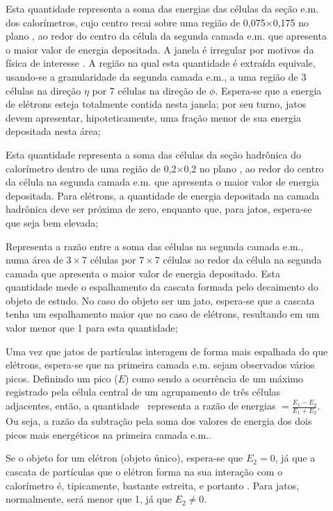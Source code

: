 \begin{description}
\item[\etem] Esta quantidade representa a soma das energias das células da
seção e.m. dos calorímetros, cujo centro recai sobre uma região de
0,075$\times$0,175 no plano \ep, ao redor do centro da célula da segunda camada
e.m. que apresenta o maior valor de energia depositada. A janela é irregular
por motivos da física de interesse \cite{hlt-tdr}. A região na qual esta
quantidade é extraída equivale, usando-se a granularidade da segunda camada
e.m., a uma região de 3 células na direção $\eta$ por 7 células na direção de
$\phi$. Espera-se que a energia de elétrons esteja totalmente contida nesta
janela; por seu turno, jatos devem apresentar, hipoteticamente, uma fração
menor de sua energia depositada nesta área;

\item[\ethad] Esta quantidade representa a soma das células da seção hadrônica
do calorímetro dentro de uma região de 0,2$\times$0,2 no plano \ep, ao redor
do centro da célula na segunda camada e.m. que apresenta o maior valor de
energia depositada. Para elétrons, a quantidade de energia depositada na
camada hadrônica deve ser próxima de zero, enquanto que, para jatos, espera-se
que seja bem elevada;

\item[\rshape] Representa a razão entre a soma das células na segunda camada
e.m., numa área de $3\times7$ células por $7\times7$ células ao redor da célula
na segunda camada que apresenta o maior valor de energia depositado. Esta
quantidade mede o espalhamento da cascata formada pelo decaimento do objeto de
estudo. No caso do objeto ser um jato, espera-se que a cascata tenha um
espalhamento maior que no caso de elétrons, resultando em um valor menor que 1
para esta quantidade;

\item[\rstrip] Uma vez que jatos de par\-tí\-culas interagem de forma mais
espalhada do que e\-lé\-trons, espera-se que na primeira camada e.m. sejam
observados vários picos. Definindo um pico ($E$) como sendo a ocorrência de um
máximo registrado pela célula central de um agrupamento de três células
adjacentes, então, a quantidade \rstrip\ representa a razão de energias
\rstrip$=\frac{E_1-E_2}{E_1+E_2}$. Ou seja, a razão da subtração pela soma dos
valores de energia dos dois picos mais energéticos na primeira camada e.m..

Se o objeto for um elétron (objeto único), espera-se que $E_2=0$, já que a
cascata de partículas que o elétron forma na sua interação com o calorímetro é,
tipicamente, bastante estreita, e portanto . Para jatos, normalmente,
\rstrip será menor que 1, já que $E_2\neq0$.
\end{description}

